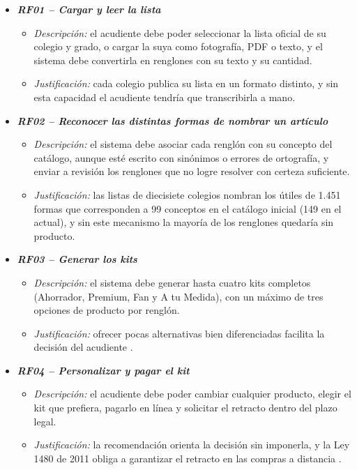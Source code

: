 \begin{itemize}
  \item \textbf{\textit{RF01 -- Cargar y leer la lista}}
    \begin{itemize}
      \item \textit{Descripción:} el acudiente debe poder seleccionar la lista oficial de su
            colegio y grado, o cargar la suya como fotografía, PDF o texto, y el sistema
            debe convertirla en renglones con su texto y su cantidad.
      \item \textit{Justificación:} cada colegio publica su lista en un formato distinto, y
            sin esta capacidad el acudiente tendría que transcribirla a mano.
    \end{itemize}

  \item \textbf{\textit{RF02 -- Reconocer las distintas formas de nombrar un artículo}}
    \begin{itemize}
      \item \textit{Descripción:} el sistema debe asociar cada renglón con su concepto del
            catálogo, aunque esté escrito con sinónimos o errores de ortografía, y enviar a
            revisión los renglones que no logre resolver con certeza suficiente.
      \item \textit{Justificación:} las listas de diecisiete colegios nombran los útiles de
            1.451 formas que corresponden a 99 conceptos en el catálogo inicial (149 en el actual), y sin este mecanismo la mayoría de
            los renglones quedaría sin producto.
    \end{itemize}

  \item \textbf{\textit{RF03 -- Generar los kits}}
    \begin{itemize}
      \item \textit{Descripción:} el sistema debe generar hasta cuatro kits completos
            (Ahorrador, Premium, Fan y A tu Medida), con un máximo de tres opciones de
            producto por renglón.
      \item \textit{Justificación:} ofrecer pocas alternativas bien diferenciadas facilita la
            decisión del acudiente \citep{iyengar_when_2000}.
    \end{itemize}

  \item \textbf{\textit{RF04 -- Personalizar y pagar el kit}}
    \begin{itemize}
      \item \textit{Descripción:} el acudiente debe poder cambiar cualquier producto, elegir
            el kit que prefiera, pagarlo en línea y solicitar el retracto dentro del plazo
            legal.
      \item \textit{Justificación:} la recomendación orienta la decisión sin imponerla, y la
            Ley 1480 de 2011 obliga a garantizar el retracto en las compras a distancia
            \citep{congreso_ley1480_2011}.
    \end{itemize}


\end{itemize}
